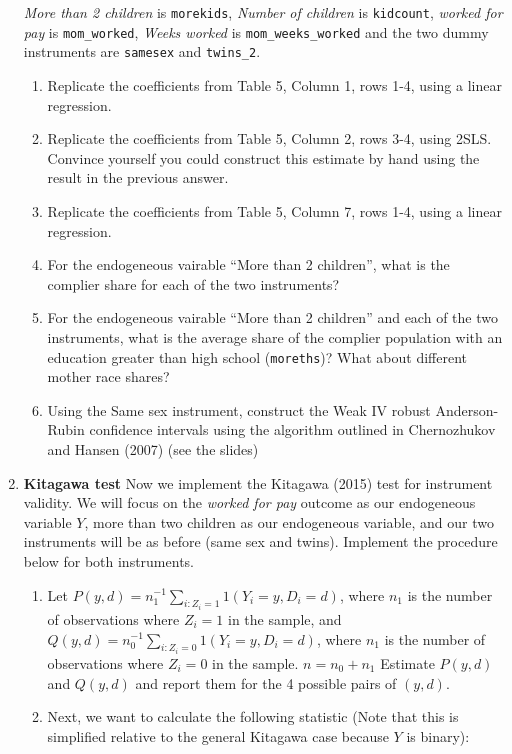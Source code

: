 \documentclass[11pt, a4paper]{article}
\begin{document}
\begin{enumerate}
  \textit{More than 2 children} is \texttt{morekids}, \textit{Number
    of children} is \texttt{kidcount}, \textit{worked for pay} is
  \texttt{mom\_worked}, \textit{Weeks worked} is
  \texttt{mom\_weeks\_worked} and the two dummy instruments are
  \texttt{samesex} and \texttt{twins\_2}.
  \begin{enumerate}
  \item Replicate the coefficients from Table 5, Column 1, rows 1-4, using a linear regression.
  \item Replicate the coefficients from Table 5, Column 2, rows 3-4,
    using 2SLS. Convince yourself you could construct this estimate by
    hand using the result in the previous answer.
  \item Replicate the coefficients from Table 5, Column 7, rows 1-4, using a linear regression.
  \item For the endogeneous vairable ``More than 2 children'', what is
    the complier share for each of the two instruments?
  \item For the endogeneous vairable ``More than 2 children'' and each
    of the two instruments, what is the average share of the complier
    population with an education greater than high school
    (\texttt{moreths})? What about different mother race shares?
  \item Using the Same sex instrument, construct the Weak IV robust
    Anderson-Rubin confidence intervals using the algorithm outlined
    in Chernozhukov and Hansen (2007) (see the slides)
  \end{enumerate}
\item \textbf{Kitagawa test} Now we implement the Kitagawa
  (2015) test for instrument validity. We will focus on the
  \textit{worked for pay} outcome as our endogeneous variable $Y$,
  more than two children as our endogeneous variable, and our two
  instruments will be as before (same sex and twins). Implement the procedure below for both instruments.
  \begin{enumerate}
  \item Let
    $P(y,d) = n_{1}^{-1} \sum_{i : Z_{i} = 1} 1(Y_{i} = y, D_{i} = d)$,
    where $n_{1}$ is the number of observations where $Z_{i} = 1$ in
    the sample, and
    $Q(y,d) = n_{0}^{-1} \sum_{i : Z_{i} = 0} 1(Y_{i} = y, D_{i} = d)$,
    where $n_{1}$ is the number of observations where $Z_{i} = 0$ in
    the sample. $n = n_{0} + n_{1}$ Estimate $P(y,d)$ and $Q(y,d)$ and
    report them for the 4 possible pairs of $(y,d)$.
  \item Next, we want to calculate the following statistic (Note that this is simplified relative to the general Kitagawa case because $Y$ is binary):

\end{enumerate}
\end{enumerate}
\end{document}
